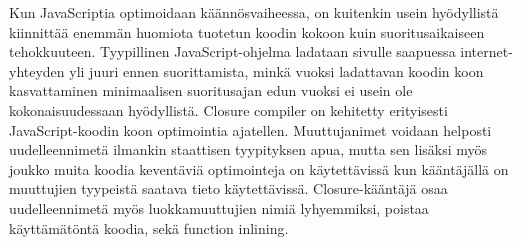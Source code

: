 Kun JavaScriptia optimoidaan käännösvaiheessa, on kuitenkin usein hyödyllistä
kiinnittää enemmän huomiota tuotetun koodin kokoon kuin suoritusaikaiseen
tehokkuuteen. Tyypillinen JavaScript-ohjelma ladataan sivulle saapuessa
internet-yhteyden yli juuri ennen suorittamista, minkä vuoksi ladattavan
koodin koon kasvattaminen minimaalisen suoritusajan edun vuoksi ei usein ole
kokonaisuudessaan hyödyllistä. Closure compiler on kehitetty erityisesti
JavaScript-koodin koon optimointia ajatellen. Muuttujanimet voidaan helposti
uudelleennimetä ilmankin staattisen tyypityksen apua, mutta sen lisäksi myös
joukko muita koodia keventäviä optimointeja on käytettävissä kun kääntäjällä
on muuttujien tyypeistä saatava tieto käytettävissä. Closure-kääntäjä osaa
uudelleennimetä myös luokkamuuttujien nimiä lyhyemmiksi, poistaa
käyttämätöntä koodia, sekä function inlining.


